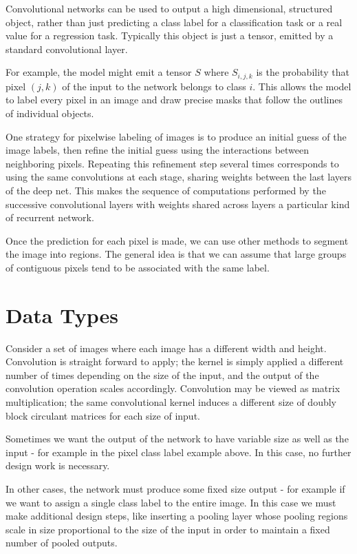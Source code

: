 \documentclass[onecolumn, letterpaper, 12pt]{report}
\begin{document}
Convolutional networks can be used to output a high dimensional, structured object, rather than just predicting a class label for a classification task or a real value for a regression task. Typically this object is just a tensor, emitted by a standard convolutional layer. 

For example, the model might emit a tensor $S$ where $S_{i,j,k}$ is the probability that pixel $(j,k)$ of the input to the network belongs to class $i$. This allows the model to label every pixel in an image and draw precise masks that follow the outlines of individual objects. 

One strategy for pixelwise labeling of images is to produce an initial guess of the image labels, then refine the initial guess using the interactions between neighboring pixels. Repeating this refinement step several times corresponds to using the same convolutions at each stage, sharing weights between the last layers of the deep net. This makes the sequence of computations performed by the successive convolutional layers with weights shared across layers a particular kind of recurrent network. 

Once the prediction for each pixel is made, we can use other methods to segment the image into regions. The general idea is that we can assume that large groups of contiguous pixels tend to be associated with the same label. 

\section{Data Types}

Consider a set of images where each image has a different width and height. Convolution is straight forward to apply; the kernel is simply applied a different number of times depending on the size of the input, and the output of the convolution operation scales accordingly. Convolution may be viewed as matrix multiplication; the same convolutional kernel induces a different size of doubly block circulant matrices for each size of input. 

Sometimes we want the output of the network to have variable size as well as the input - for example in the pixel class label example above. In this case, no further design work is necessary. 

In other cases, the network must produce some fixed size output - for example if we want to assign a single class label to the entire image. In this case we must make additional design steps, like inserting a pooling layer whose pooling regions scale in size proportional to the size of the input in order to maintain a fixed number of pooled outputs. 
\end{document}
